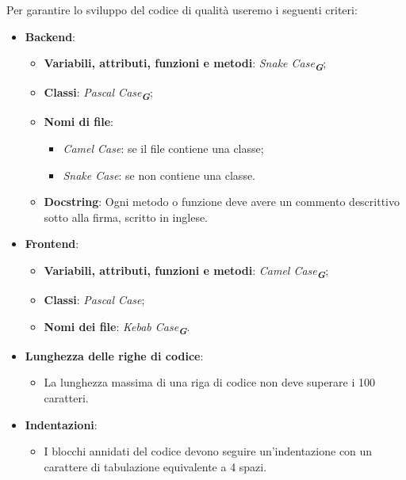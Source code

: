 Per garantire lo sviluppo del codice di qualità useremo i seguenti criteri:

\begin{itemize}
    \item \textbf{Backend}:
    \begin{itemize}
        \item \textbf{Variabili, attributi, funzioni e metodi}: \emph{Snake Case}\textsubscript{\textit{\textbf{G}}};
        \item \textbf{Classi}: \emph{Pascal Case}\textsubscript{\textit{\textbf{G}}}; 
        \item \textbf{Nomi di file}:
        \begin{itemize}
            \item \emph{Camel Case}: se il file contiene una classe;
            \item \emph{Snake Case}: se non contiene una classe.
        \end{itemize}
        \item \textbf{Docstring}: Ogni metodo o funzione deve avere un commento descrittivo sotto alla firma, scritto in inglese.
    \end{itemize}
    
    \item \textbf{Frontend}:
    \begin{itemize}
        \item \textbf{Variabili, attributi, funzioni e metodi}: \emph{Camel Case}\textsubscript{\textit{\textbf{G}}};
        \item \textbf{Classi}: \emph{Pascal Case};
        \item \textbf{Nomi dei file}: \emph{Kebab Case}\textsubscript{\textit{\textbf{G}}}.
    \end{itemize}
    
    \item \textbf{Lunghezza delle righe di codice}:
    \begin{itemize}
        \item La lunghezza massima di una riga di codice non deve superare i 100 caratteri.
    \end{itemize}
    
    \item \textbf{Indentazioni}:
    \begin{itemize}
        \item I blocchi annidati del codice devono seguire un'indentazione con un carattere di tabulazione equivalente a 4 spazi.
    \end{itemize}
\end{itemize}

